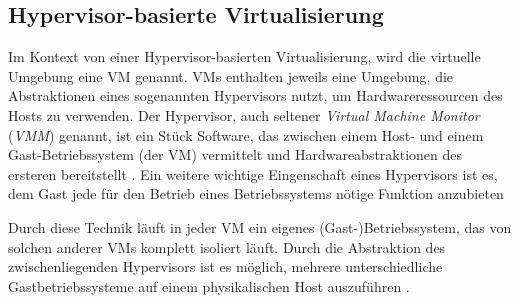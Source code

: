 \documentclass[../main.tex]{subfiles}
\begin{document}





    \subsection{Hypervisor-basierte Virtualisierung}
    \label{introVirtHypervisor}
      Im Kontext von einer Hypervisor-basierten Virtualisierung, wird die virtuelle Umgebung eine \acrshort{VM} genannt. \acrshort{VM}s enthalten jeweils eine Umgebung, die Abstraktionen eines sogenannten Hypervisors nutzt, um Hardwareressourcen des Hosts zu verwenden. Der Hypervisor, auch seltener \emph{Virtual Machine Monitor} (\emph{VMM}) genannt, ist ein Stück Software, das zwischen einem Host- und einem Gast-Betriebssystem (der \acrshort{VM}) vermittelt und Hardwareabstraktionen des ersteren bereitstellt \cite[S.6]{dockerBook}\cite[S.2]{containerVirtPerformance}\cite[S.2]{dockerSec1}. Ein weitere wichtige Eingenschaft eines Hypervisors ist es, dem Gast jede für den Betrieb eines Betriebssystems nötige Funktion anzubieten \cite[S.106]{tanenbaumOS}


      Durch diese Technik läuft in jeder \acrshort{VM} ein eigenes (Gast-)Betriebssystem, das von solchen anderer \acrshort{VM}s komplett isoliert läuft. Durch die Abstraktion des zwischenliegenden Hypervisors ist es möglich, mehrere unterschiedliche Gastbetriebssysteme auf einem physikalischen Host auszuführen \cite[S.2]{containerVirtPerformance}\cite[S.106]{tanenbaumOS}.
\end{document}
